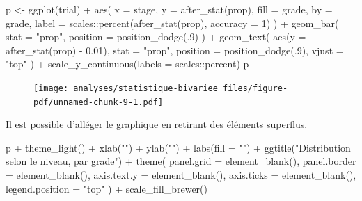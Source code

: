 \documentclass[
  letterpaper,
  DIV=11,
  numbers=noendperiod,
  oneside]{scrreprt}
\newenvironment{Shaded}{\begin{snugshade}}{\end{snugshade}}
\newcommand{\AttributeTok}[1]{\textcolor[rgb]{0.40,0.45,0.13}{#1}}
\newcommand{\DecValTok}[1]{\textcolor[rgb]{0.68,0.00,0.00}{#1}}
\newcommand{\FloatTok}[1]{\textcolor[rgb]{0.68,0.00,0.00}{#1}}
\newcommand{\FunctionTok}[1]{\textcolor[rgb]{0.28,0.35,0.67}{#1}}
\newcommand{\NormalTok}[1]{\textcolor[rgb]{0.00,0.23,0.31}{#1}}
\newcommand{\OtherTok}[1]{\textcolor[rgb]{0.00,0.23,0.31}{#1}}
\newcommand{\SpecialCharTok}[1]{\textcolor[rgb]{0.37,0.37,0.37}{#1}}
\newcommand{\StringTok}[1]{\textcolor[rgb]{0.13,0.47,0.30}{#1}}
\begin{document}
\begin{tcolorbox}
\begin{Shaded}
\begin{Highlighting}[]
\NormalTok{p }\OtherTok{\textless{}{-}} \FunctionTok{ggplot}\NormalTok{(trial) }\SpecialCharTok{+}
  \FunctionTok{aes}\NormalTok{(}
    \AttributeTok{x =}\NormalTok{ stage,}
    \AttributeTok{y =} \FunctionTok{after\_stat}\NormalTok{(prop),}
    \AttributeTok{fill =}\NormalTok{ grade, }
    \AttributeTok{by =}\NormalTok{ grade,}
    \AttributeTok{label =}\NormalTok{ scales}\SpecialCharTok{::}\FunctionTok{percent}\NormalTok{(}\FunctionTok{after\_stat}\NormalTok{(prop), }\AttributeTok{accuracy =} \DecValTok{1}\NormalTok{)}
\NormalTok{  ) }\SpecialCharTok{+}
  \FunctionTok{geom\_bar}\NormalTok{(}
    \AttributeTok{stat =} \StringTok{"prop"}\NormalTok{, }
    \AttributeTok{position =} \FunctionTok{position\_dodge}\NormalTok{(.}\DecValTok{9}\NormalTok{)}
\NormalTok{  ) }\SpecialCharTok{+}
  \FunctionTok{geom\_text}\NormalTok{(}
    \FunctionTok{aes}\NormalTok{(}\AttributeTok{y =} \FunctionTok{after\_stat}\NormalTok{(prop) }\SpecialCharTok{{-}} \FloatTok{0.01}\NormalTok{),}
    \AttributeTok{stat =} \StringTok{"prop"}\NormalTok{, }
    \AttributeTok{position =} \FunctionTok{position\_dodge}\NormalTok{(.}\DecValTok{9}\NormalTok{),}
    \AttributeTok{vjust =} \StringTok{"top"}
\NormalTok{  ) }\SpecialCharTok{+}
  \FunctionTok{scale\_y\_continuous}\NormalTok{(}\AttributeTok{labels =}\NormalTok{ scales}\SpecialCharTok{::}\NormalTok{percent)}
\NormalTok{p}
\end{Highlighting}
\end{Shaded}

\begin{figure}[H]

{\centering \texttt{[image: analyses/statistique-bivariee\_files/figure-pdf/unnamed-chunk-9-1.pdf]}

}

\end{figure}

Il est possible d'alléger le graphique en retirant des éléments
superflus.

\begin{Shaded}
\begin{Highlighting}[]
\NormalTok{p }\SpecialCharTok{+} 
  \FunctionTok{theme\_light}\NormalTok{() }\SpecialCharTok{+}
  \FunctionTok{xlab}\NormalTok{(}\StringTok{""}\NormalTok{) }\SpecialCharTok{+}
  \FunctionTok{ylab}\NormalTok{(}\StringTok{""}\NormalTok{) }\SpecialCharTok{+}
  \FunctionTok{labs}\NormalTok{(}\AttributeTok{fill =} \StringTok{""}\NormalTok{) }\SpecialCharTok{+}
  \FunctionTok{ggtitle}\NormalTok{(}\StringTok{"Distribution selon le niveau, par grade"}\NormalTok{) }\SpecialCharTok{+}
  \FunctionTok{theme}\NormalTok{(}
    \AttributeTok{panel.grid =} \FunctionTok{element\_blank}\NormalTok{(),}
    \AttributeTok{panel.border =} \FunctionTok{element\_blank}\NormalTok{(),}
    \AttributeTok{axis.text.y =} \FunctionTok{element\_blank}\NormalTok{(),}
    \AttributeTok{axis.ticks =} \FunctionTok{element\_blank}\NormalTok{(),}
    \AttributeTok{legend.position =} \StringTok{"top"}
\NormalTok{  ) }\SpecialCharTok{+}
  \FunctionTok{scale\_fill\_brewer}\NormalTok{()}
\end{Highlighting}
\end{Shaded}


\end{tcolorbox}
\end{document}
